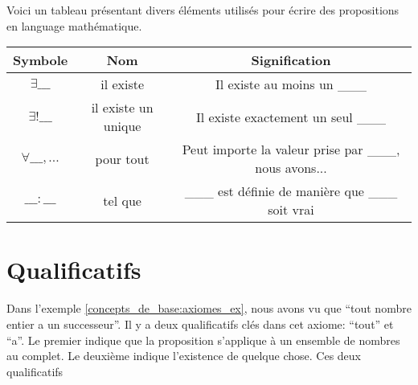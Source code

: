 Voici un tableau présentant divers éléments utilisés pour écrire des propositions en language mathématique.
\begin{table}[H]
    \centering
    \begin{tabular}{|c|c|c|}
        \hline
        \textbf{Symbole} & \textbf{Nom} & \textbf{Signification} \\ \hline
        $\exists \_\_\_$ & il existe & Il existe au moins un \_\_\_ \\ \hline
        $\exists ! \_\_\_$ & il existe un unique & Il existe exactement un seul \_\_\_ \\ \hline
        $\forall \_\_\_, ...$ & pour tout & Peut importe la valeur prise par \_\_\_, nous avons... \\ \hline
        $\_\_\_ : \_\_\_$ & tel que & \_\_\_ est définie de manière que \_\_\_ soit vrai \\ \hline
    \end{tabular}
\end{table}

\section{Qualificatifs}

Dans l'exemple \ref{concepts_de_base:axiomes_ex}, nous avons vu que ``tout nombre entier a un successeur''. Il y a deux qualificatifs clés dans cet axiome: ``tout'' et ``a''. Le premier indique que la proposition s'applique à un ensemble de nombres au complet. Le deuxième indique l'existence de quelque chose. Ces deux qualificatifs
